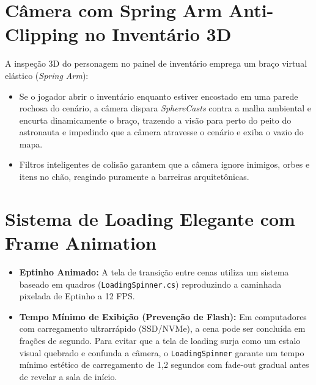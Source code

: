 \documentclass[a4paper,12pt]{report}
\begin{document}
\section{Câmera com Spring Arm Anti-Clipping no Inventário 3D}
A inspeção 3D do personagem no painel de inventário emprega um braço virtual elástico (\textit{Spring Arm}):
\begin{itemize}
    \item Se o jogador abrir o inventário enquanto estiver encostado em uma parede rochosa do cenário, a câmera dispara \textit{SphereCasts} contra a malha ambiental e encurta dinamicamente o braço, trazendo a visão para perto do peito do astronauta e impedindo que a câmera atravesse o cenário e exiba o vazio do mapa.
    \item Filtros inteligentes de colisão garantem que a câmera ignore inimigos, orbes e itens no chão, reagindo puramente a barreiras arquitetônicas.
\end{itemize}

\section{Sistema de Loading Elegante com Frame Animation}
\begin{itemize}
    \item \textbf{Eptinho Animado:} A tela de transição entre cenas utiliza um sistema baseado em quadros (\texttt{LoadingSpinner.cs}) reproduzindo a caminhada pixelada de Eptinho a 12 FPS.
    \item \textbf{Tempo Mínimo de Exibição (Prevenção de Flash):} Em computadores com carregamento ultrarrápido (SSD/NVMe), a cena pode ser concluída em frações de segundo. Para evitar que a tela de loading surja como um estalo visual quebrado e confunda a câmera, o \texttt{LoadingSpinner} garante um tempo mínimo estético de carregamento de 1,2 segundos com fade-out gradual antes de revelar a sala de início.
\end{itemize}
\end{document}

